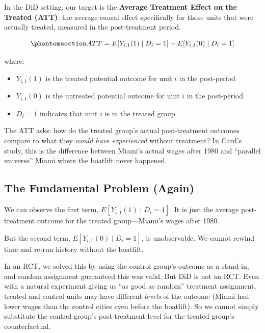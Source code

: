\documentclass[
  letterpaper,
  DIV=11,
  numbers=noendperiod]{scrreprt}
\providecommand{\tightlist}{%
  \setlength{\itemsep}{0pt}\setlength{\parskip}{0pt}}
\begin{document}
In the DiD setting, our target is the \textbf{Average Treatment Effect
on the Treated (ATT)}: the average causal effect specifically for those
units that were actually treated, measured in the post-treatment period.

\begin{equation}\protect\phantomsection\label{eq-att}{
ATT = E[Y_{i,1}(1) \mid D_i = 1] - E[Y_{i,1}(0) \mid D_i = 1]
}\end{equation}

where:

\begin{itemize}
\tightlist
\item
  \(Y_{i,1}(1)\) is the treated potential outcome for unit \(i\) in the
  post-period
\item
  \(Y_{i,1}(0)\) is the untreated potential outcome for unit \(i\) in
  the post-period
\item
  \(D_i = 1\) indicates that unit \(i\) is in the treated group
\end{itemize}

The ATT asks: how do the treated group's actual post-treatment outcomes
compare to what they \emph{would have experienced} without treatment? In
Card's study, this is the difference between Miami's actual wages after
1980 and ``parallel universe'' Miami where the boatlift never happened.

\subsection{The Fundamental Problem
(Again)}\label{the-fundamental-problem-again}

We can observe the first term, \(E[Y_{i,1}(1) \mid D_i = 1]\). It is
just the average post-treatment outcome for the treated group---Miami's
wages after 1980.

But the second term, \(E[Y_{i,1}(0) \mid D_i = 1]\), is unobservable. We
cannot rewind time and re-run history without the boatlift.

In an RCT, we solved this by using the control group's outcome as a
stand-in, and random assignment guaranteed this was valid. But DiD is
not an RCT. Even with a natural experiment giving us ``as good as
random'' treatment assignment, treated and control units may have
different \emph{levels} of the outcome (Miami had lower wages than the
control cities even before the boatlift). So we cannot simply substitute
the control group's post-treatment level for the treated group's
counterfactual.
\end{document}
